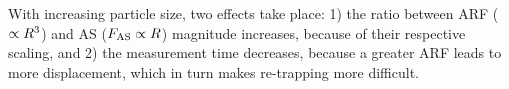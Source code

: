 With increasing particle size, two effects take place: 1) the ratio between ARF 
($\propto R^{3}$) and AS ($F_{\text{AS}}\propto R$) magnitude increases, because of 
their respective scaling, and 2) the measurement time decreases, because a 
greater ARF leads to more displacement, which in turn makes re-trapping more 
difficult.




